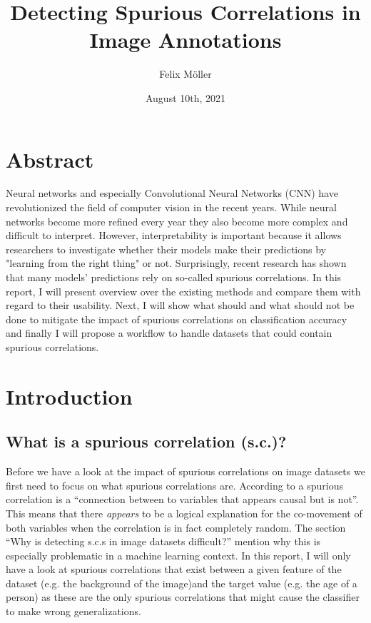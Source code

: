\documentclass{article}
\title{Detecting Spurious Correlations in Image Annotations}
\author{Felix Möller}
\date{August 10th, 2021}
\begin{document}
\maketitle
\tableofcontents
\newpage
\section{Abstract}
Neural networks and especially Convolutional Neural Networks (CNN) have revolutionized the field of computer vision in the recent years. While neural networks become more refined every year they also become more complex and difficult to interpret. However, interpretability is important because it allows researchers to investigate whether their models make their predictions by "learning from the right thing" or not. Surprisingly, recent research has shown that many models' predictions rely on so-called spurious correlations. In this report, I will present overview over the existing methods and compare them with regard to their usability. Next, I will show what should and what should not be done to mitigate the impact of spurious correlations on classification accuracy and finally I will propose a workflow to handle datasets that could contain spurious correlations. 


\section{Introduction}
\subsection{What is a spurious correlation (s.c.)?}
Before we have a look at the impact of spurious correlations on image datasets we first need to focus on what spurious correlations are. According to \cite{sc_def} a spurious correlation is a \enquote{connection between to variables that appears causal but is not}. This means that there \textit{appears} to be a logical explanation for the co-movement of both variables when the correlation is in fact completely random. The section \enquote{Why is detecting s.c.s in image datasets difficult?} mention why this is especially problematic in a machine learning context.
In this report, I will only have a look at spurious correlations that exist between a given feature of the dataset (e.g. the background of the image)and the target value (e.g. the age of a person) as these are the only spurious correlations that might cause the classifier to make wrong generalizations.
\end{document}
